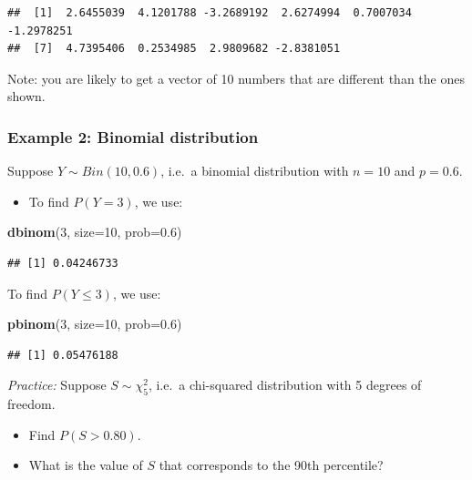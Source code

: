 \documentclass[
]{book}
\newenvironment{Shaded}{\begin{snugshade}}{\end{snugshade}}
\newcommand{\AttributeTok}[1]{\textcolor[rgb]{0.13,0.29,0.53}{#1}}
\newcommand{\DecValTok}[1]{\textcolor[rgb]{0.00,0.00,0.81}{#1}}
\newcommand{\FloatTok}[1]{\textcolor[rgb]{0.00,0.00,0.81}{#1}}
\newcommand{\FunctionTok}[1]{\textcolor[rgb]{0.13,0.29,0.53}{\textbf{#1}}}
\newcommand{\NormalTok}[1]{#1}
\providecommand{\tightlist}{%
  \setlength{\itemsep}{0pt}\setlength{\parskip}{0pt}}
\theoremstyle{definition}
\theoremstyle{definition}
\theoremstyle{definition}
\theoremstyle{definition}
\theoremstyle{remark}
\begin{document}
\begin{verbatim}
##  [1]  2.6455039  4.1201788 -3.2689192  2.6274994  0.7007034 -1.2978251
##  [7]  4.7395406  0.2534985  2.9809682 -2.8381051
\end{verbatim}

Note: you are likely to get a vector of 10 numbers that are different than the ones shown.

\hypertarget{example-2-binomial-distribution}{%
\subsubsection{Example 2: Binomial distribution}\label{example-2-binomial-distribution}}

Suppose \(Y \sim Bin(10, 0.6)\), i.e.~a binomial distribution with \(n=10\) and \(p=0.6\).

\begin{itemize}
\tightlist
\item
  To find \(P(Y=3)\), we use:
\end{itemize}

\begin{Shaded}
\begin{Highlighting}[]
\FunctionTok{dbinom}\NormalTok{(}\DecValTok{3}\NormalTok{, }\AttributeTok{size=}\DecValTok{10}\NormalTok{, }\AttributeTok{prob=}\FloatTok{0.6}\NormalTok{)}
\end{Highlighting}
\end{Shaded}

\begin{verbatim}
## [1] 0.04246733
\end{verbatim}

To find \(P(Y \leq 3)\), we use:

\begin{Shaded}
\begin{Highlighting}[]
\FunctionTok{pbinom}\NormalTok{(}\DecValTok{3}\NormalTok{, }\AttributeTok{size=}\DecValTok{10}\NormalTok{, }\AttributeTok{prob=}\FloatTok{0.6}\NormalTok{)}
\end{Highlighting}
\end{Shaded}

\begin{verbatim}
## [1] 0.05476188
\end{verbatim}

\emph{Practice:} Suppose \(S \sim \chi_5^2\), i.e.~a chi-squared distribution with 5 degrees of freedom.

\begin{itemize}
\tightlist
\item
  Find \(P(S > 0.80)\).
\item
  What is the value of \(S\) that corresponds to the 90th percentile?
\end{itemize}
\end{document}
